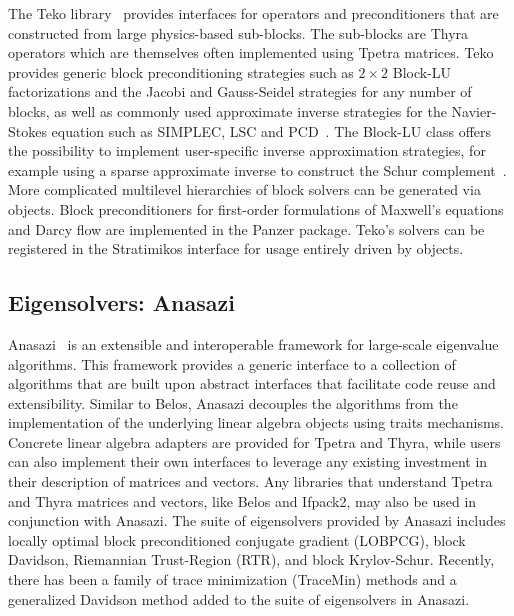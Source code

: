 The Teko library~\cite{Cyr2016a} provides interfaces for operators and preconditioners that are constructed from large physics-based sub-blocks.
The sub-blocks are Thyra operators which are themselves often implemented using Tpetra matrices.
Teko provides generic block preconditioning strategies such as $2\times2$ Block-LU factorizations and the Jacobi and Gauss-Seidel strategies for any number of blocks,
as well as commonly used approximate inverse strategies for the Navier-Stokes equation
such as SIMPLEC, LSC and PCD~\cite{CyrShadidEtAl2012_StabilizationScalableBlockPreconditioning}.
The Block-LU class offers the possibility to implement user-specific inverse approximation strategies,
for example using a sparse approximate inverse to construct the Schur complement~\cite{Firmbach2024a}.
More complicated multilevel hierarchies of block solvers can be generated via  objects.
Block preconditioners for first-order formulations of Maxwell's equations and Darcy flow are implemented in the Panzer package.
Teko's solvers can be registered in the Stratimikos interface for usage entirely driven by  objects.

\subsection{Eigensolvers: Anasazi}
Anasazi~\cite{Baker2009a} is an extensible and interoperable framework for large-scale eigenvalue algorithms.
This framework provides a generic interface to a collection of algorithms that are built upon abstract interfaces
that facilitate code reuse and extensibility.  Similar to Belos, Anasazi decouples the algorithms from the
implementation of the underlying linear algebra objects using traits mechanisms.  Concrete linear algebra adapters
are provided for Tpetra and Thyra, while users can also implement their own interfaces to leverage any existing
investment in their description of matrices and vectors.  Any libraries that understand Tpetra and Thyra matrices
and vectors, like Belos and Ifpack2, may also be used in conjunction with Anasazi.  The suite of eigensolvers provided
by Anasazi includes locally optimal block preconditioned conjugate gradient (LOBPCG), block Davidson, Riemannian Trust-Region
(RTR), and block Krylov-Schur.  Recently, there has been a family of trace minimization (TraceMin) methods and a
generalized Davidson method added to the suite of eigensolvers in Anasazi.


